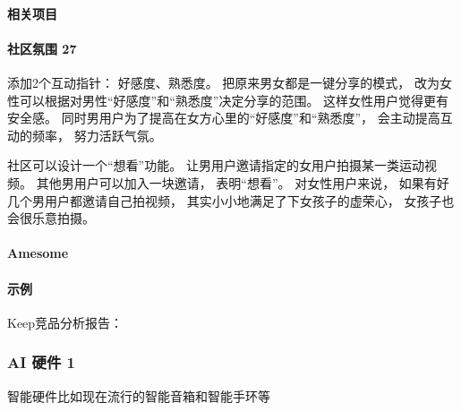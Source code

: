 \documentclass[letterpaper,10pt,english]{sphinxmanual}
\begin{document}
\paragraph{相关项目}
\label{\detokenize{chapter_project/AI_fit:id20}}


\paragraph{社区氛围 27\sphinxfootnotemark[785]}
\label{\detokenize{chapter_project/AI_fit:id21}}%
\begin{footnotetext}[785]\sphinxAtStartFootnote
{}
%
\end{footnotetext}\ignorespaces 
添加2个互动指针： 好感度、熟悉度。 把原来男女都是一键分享的模式，
改为女性可以根据对男性“好感度”和“熟悉度”决定分享的范围。
这样女性用户觉得更有安全感。
同时男用户为了提高在女方心里的“好感度”和“熟悉度”，
会主动提高互动的频率， 努力活跃气氛。

社区可以设计一个“想看”功能。
让男用户邀请指定的女用户拍摄某一类运动视频。
其他男用户可以加入一块邀请， 表明“想看”。 对女性用户来说，
如果有好几个男用户都邀请自己拍视频， 其实小小地满足了下女孩子的虚荣心，
女孩子也会很乐意拍摄。


\paragraph{Amesome}
\label{\detokenize{chapter_project/AI_fit:amesome}}


\paragraph{示例}
\label{\detokenize{chapter_project/AI_fit:id22}}
Keep竞品分析报告：


\subsubsection{AI 硬件 1\sphinxfootnotemark[786]}
\label{\detokenize{chapter_project/AI_hardware:ai-1}}\label{\detokenize{chapter_project/AI_hardware::doc}}%
\begin{footnotetext}[786]\sphinxAtStartFootnote
{}
%
\end{footnotetext}\ignorespaces 
智能硬件比如现在流行的智能音箱和智能手环等
\end{document}
